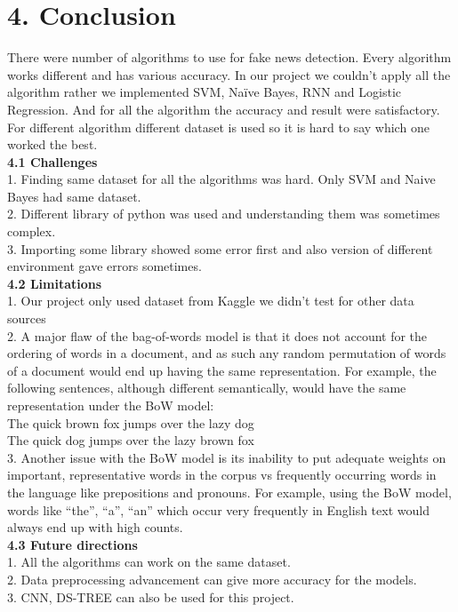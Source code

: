 \documentclass[12pt]{article}
\begin{document}
\section*{4. Conclusion}
There were number of algorithms to use for fake news detection. Every algorithm works different and has various accuracy. In our project we couldn’t apply all the algorithm rather we implemented SVM, Naïve Bayes, RNN and Logistic Regression. And for all the algorithm the accuracy and result were satisfactory. For different algorithm different dataset is used so it is hard to say which one worked the best.\\

 \textbf{4.1 Challenges}\\
1. Finding same dataset for all the algorithms was hard. Only SVM and Naive Bayes had same dataset.\\
2. Different library of python was used and understanding them was sometimes complex.\\
3. Importing some library showed some error first and also version of different environment gave errors sometimes.\\

\textbf{4.2 Limitations}\\
1. Our project only used dataset from Kaggle we didn’t test for other data sources\\
2. A major flaw of the bag-of-words model is that it does not account for the ordering of words in a document, and as such any random permutation of words of a document would end up having the same representation. For example, the following sentences, although different semantically, would have the same representation under the BoW model:\\ The quick brown fox jumps over the lazy dog \\The quick dog jumps over the lazy brown fox\\
3. Another issue with the BoW model is its inability to put adequate weights on important, representative words in the corpus vs frequently occurring words in the language like prepositions and pronouns. For example, using the BoW model, words like “the”, “a”, “an” which occur very frequently in English text would always end up with high counts.\\

\textbf{4.3 Future directions}\\
	1. All the algorithms can work on the same dataset.\\
	2. Data preprocessing advancement can give more accuracy for the models.\\
	3. CNN, DS-TREE can also be used for this project.
\newpage
\end{document}

